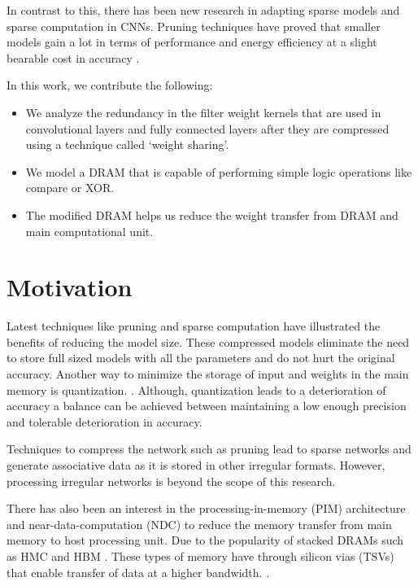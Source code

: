 \documentclass[conference]{IEEEtran}
\begin{document}
In contrast to this, there has been new research in adapting sparse models and sparse computation in CNNs. Pruning techniques have proved that smaller models gain a lot in terms of performance and energy efficiency at a slight bearable cost in accuracy \cite{zhu2017prune, DBLP:journals/corr/abs-1708-04485, han2016eie, liu2018efficient, mao2017exploring, han2016dsd}.

In this work, we contribute the following:
\begin{itemize}
\item We analyze the redundancy in the filter weight kernels that are used in convolutional layers and fully connected layers after they are compressed using a technique called `weight sharing'. \cite{han2015deep} 
\item We model a DRAM that is capable of performing simple logic operations like compare or XOR.
\item The modified DRAM helps us reduce the weight transfer from DRAM and main computational unit. 
\end{itemize}

\section{Motivation}
Latest techniques like pruning and sparse computation have illustrated the benefits of reducing the model size. 
These compressed models eliminate the need to store full sized models with all the parameters and do not hurt the original accuracy\cite{li2016pruning}. Another way to minimize the storage of input and weights in the main memory is quantization. \cite{wu2016quantized, jouppi2017datacenter, HSong_lecture}. Although, quantization leads to a deterioration of accuracy a balance can be achieved between maintaining a low enough precision and tolerable deterioration in accuracy. 


Techniques to compress the network such as pruning lead to sparse networks and generate associative data as it is stored in other irregular formats. However, processing irregular networks is beyond the scope of this research. 

There has also been an interest in the processing-in-memory (PIM) architecture and near-data-computation (NDC) to reduce the memory transfer from main memory to host processing unit\cite{kim2016neurocube, gao2017tetris, jiang2017xnor, chi2016prime}. Due to the popularity of stacked DRAMs such as HMC and HBM \cite{black2013hybrid, standard2013high}. \color{red} These types of memory have through silicon vias (TSVs) that enable transfer of data at a higher bandwidth. \color{black}.
\end{document}
